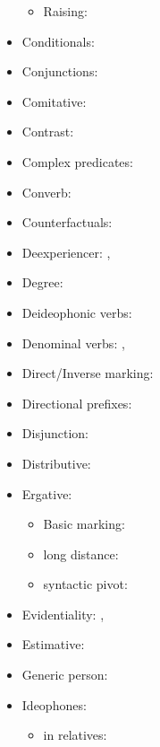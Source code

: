 \documentclass[oldfontcommands,oneside,a4paper,11pt]{article}
\begin{document}
\begin{itemize}
\begin{itemize}
\item  Raising: \citet{jacques15causative}
\end{itemize}
\item Conditionals:  \citet[296-300]{jacques14linking}
\item Conjunctions:  \citet[276-7]{jacques14linking}
\item Comitative: \citet[272-4]{jacques14linking}
\item Contrast:  \citet[315-8]{jacques14linking}
\item Complex predicates: \citet{jacques12incorp}
\item Converb:  \citet[269-272;307-8;321-2]{jacques14linking}
\item Counterfactuals:  \citet[301-2]{jacques14linking}
\item Deexperiencer: \citet[216-7]{jacques12demotion}, \citet{jacques14antipassive}
\item Degree: \citet{jacques15comparative}
\item Deideophonic verbs: \citet[278-282]{japhug14ideophones}
\item Denominal verbs:  \citet{jacques12incorp}, \citet{jacques14antipassive}
\item Direct/Inverse marking: \citet{jacques10inverse}
\item Directional prefixes:  \citet[267-8]{jacques14linking}
\item Disjunction:  \citet[318-9]{jacques14linking}
\item Distributive: \citet{jacques15comparative}
\item Ergative:   \citet{jacques15comparative}
\begin{itemize}
\item Basic marking: \citet[131-2]{jacques10inverse}
\item long distance: \citet[278]{jacques14linking}
\item syntactic pivot:   \citet[208]{jacques12demotion}
\end{itemize}
\item Evidentiality: \citet[380-390]{jacques04these}, \citet{jacques08}
\item Estimative: \citet{jacques13tropative}
\item Generic person:   \citet[204-8]{jacques12demotion}
\item Ideophones: \citet{japhug14ideophones}
\begin{itemize}
\item in relatives: \citet[275]{japhug14ideophones}

\end{itemize}
\end{itemize}
\end{document}
